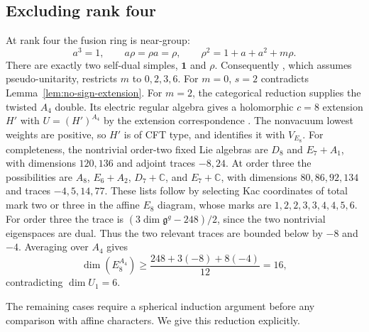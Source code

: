 \documentclass[11pt,a4paper]{article}
\theoremstyle{definition}
\begin{document}
\subsection{Excluding rank four}

At rank four the fusion ring is near-group:
\[
 a^3=1,\qquad a\rho=\rho a=\rho,\qquad
 \rho^2=1+a+a^2+m\rho.
\]
There are exactly two self-dual simples, $\mathbf1$ and $\rho$.
Consequently \cite[Theorem~1.1]{Larson}, which assumes
pseudo-unitarity, restricts $m$ to $0,2,3,6$.
For $m=0$, $s=2$ contradicts Lemma~\ref{lem:no-sign-extension}.
For $m=2$, the categorical reduction
\cite[Theorem~7.1 and Corollary~7.4]{EGO} supplies the twisted $A_4$ double.
Its electric regular algebra gives a holomorphic $c=8$ extension
$H'$ with $U=(H')^{A_4}$ by the extension correspondence
\cite{HKL}. The nonvacuum lowest weights are positive, so $H'$ is
of CFT type, and \cite[Theorem~1]{DM} identifies it with $V_{E_8}$.
For completeness, the nontrivial order-two fixed Lie algebras are
$D_8$ and $E_7+A_1$, with dimensions $120,136$ and adjoint traces
$-8,24$. At order three the possibilities are
$A_8$, $E_6+A_2$, $D_7+\mathbb C$, and $E_7+\mathbb C$,
with dimensions $80,86,92,134$ and traces $-4,5,14,77$.
These lists follow by selecting Kac coordinates of total mark two
or three in the affine $E_8$ diagram, whose marks are
$1,2,2,3,3,4,4,5,6$. For order three the trace is
$(3\dim\mathfrak g^g-248)/2$, since the two nontrivial eigenspaces
are dual. Thus the two relevant traces are bounded below by $-8$
and $-4$. Averaging over $A_4$ gives
\[
 \dim(E_8^{A_4})\ge\frac{248+3(-8)+8(-4)}{12}=16,
\]
contradicting $\dim U_1=6$.

The remaining cases require a spherical induction argument before any
comparison with affine characters. We give this reduction explicitly.
\end{document}
